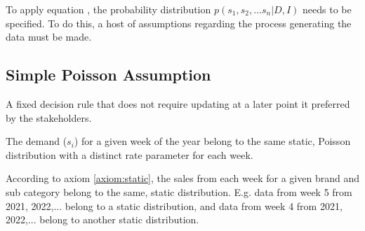 To apply equation , the probability distribution $p(s_1,s_2,\dots s_n|D,I)$ needs to be specified. To do this, a host of assumptions regarding the process generating the data must be made.

\subsection{Simple Poisson Assumption}
A fixed decision rule that does not require updating at a later point it preferred by the stakeholders.

\begin{axiom}
	\label{axiom:static}
	The demand ($s_i$) for a given week of the year belong to the same static, Poisson distribution with a distinct rate parameter for each week. 
\end{axiom}

\begin{example}
	According to axiom \ref{axiom:static}, the sales from each week for a given brand and sub category belong to the same, static distribution. E.g. data from week 5 from 2021, 2022,... belong to a static distribution, and data from week 4 from 2021, 2022,... belong to another static distribution.
\end{example}

